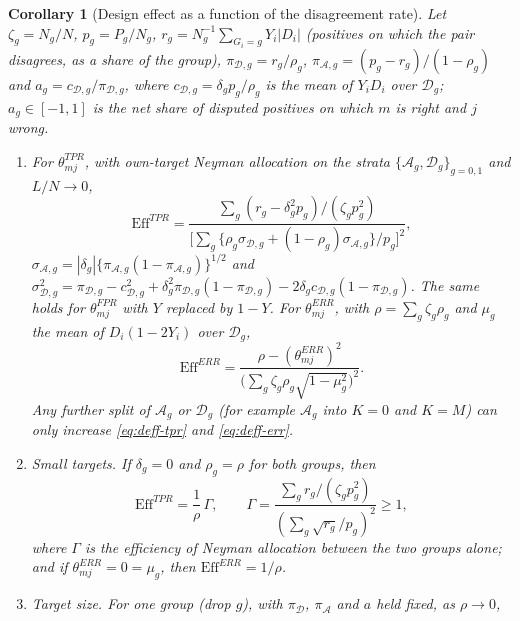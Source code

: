 \documentclass[pdflatex,sn-mathphys-num,iicol]{sn-jnl}
\theoremstyle{thmstyleone}
\newtheorem{corollary}[proposition]{Corollary}
\theoremstyle{thmstyletwo}
\theoremstyle{thmstylethree}
\begin{document}
\begin{corollary}[Design effect as a function of the disagreement rate]\label{prop:deff}
Let $\zeta_g=N_g/N$, $p_g=P_g/N_g$, $r_g=N_g^{-1}\sum_{G_i=g}Y_i|D_i|$ (positives on which the pair
disagrees, as a share of the group), $\pi_{\mathcal D,g}=r_g/\rho_g$,
$\pi_{\mathcal A,g}=(p_g-r_g)/(1-\rho_g)$ and $a_g=c_{\mathcal D,g}/\pi_{\mathcal D,g}$, where
$c_{\mathcal D,g}=\delta_gp_g/\rho_g$ is the mean of $Y_iD_i$ over $\mathcal D_g$; $a_g\in[-1,1]$
is the net share of disputed positives on which $m$ is right and $j$ wrong.
\begin{enumerate}
\item[(a)] For $\theta^{TPR}_{mj}$, with own-target Neyman allocation on the strata
$\{\mathcal A_g,\mathcal D_g\}_{g=0,1}$ and $L/N\to0$,
\begin{equation}\label{eq:deff-tpr}
\mathrm{Eff}^{TPR}=\frac{\sum_g(r_g-\delta_g^2p_g)/(\zeta_gp_g^2)}
{\big[\sum_g\{\rho_g\sigma_{\mathcal D,g}+(1-\rho_g)\sigma_{\mathcal A,g}\}/p_g\big]^2},
\end{equation}
$\sigma_{\mathcal A,g}=|\delta_g|\{\pi_{\mathcal A,g}(1-\pi_{\mathcal A,g})\}^{1/2}$ and $\sigma^2_{\mathcal D,g}=\pi_{\mathcal D,g}-c_{\mathcal D,g}^2+\delta_g^2\pi_{\mathcal D,g}(1-\pi_{\mathcal D,g})
-2\delta_gc_{\mathcal D,g}(1-\pi_{\mathcal D,g})$. The same holds for $\theta^{FPR}_{mj}$ with $Y$
replaced by $1-Y$. For $\theta^{ERR}_{mj}$, with $\rho=\sum_g\zeta_g\rho_g$ and $\mu_g$ the mean of
$D_i(1-2Y_i)$ over $\mathcal D_g$,
\begin{equation}\label{eq:deff-err}
\mathrm{Eff}^{ERR}=\frac{\rho-(\theta^{ERR}_{mj})^2}{\big(\sum_g\zeta_g\rho_g\sqrt{1-\mu_g^2}\big)^2}.
\end{equation}
Any further split of $\mathcal A_g$ or $\mathcal D_g$ (for example $\mathcal A_g$ into $K=0$ and
$K=M$) can only increase \eqref{eq:deff-tpr} and \eqref{eq:deff-err}.
\item[(b)] \emph{Small targets.} If $\delta_g=0$ and $\rho_g=\rho$ for both groups, then
\begin{equation}\label{eq:deff-small}
\mathrm{Eff}^{TPR}=\frac1\rho\,\Gamma,\qquad
\Gamma=\frac{\sum_gr_g/(\zeta_gp_g^2)}{(\sum_g\sqrt{r_g}/p_g)^2}\ge1,
\end{equation}
where $\Gamma$ is the efficiency of Neyman allocation between the two groups alone; and if
$\theta^{ERR}_{mj}=0=\mu_g$, then $\mathrm{Eff}^{ERR}=1/\rho$.
\item[(c)] \emph{Target size.} For one group (drop $g$), with $\pi_{\mathcal D}$,
$\pi_{\mathcal A}$ and $a$ held fixed, as $\rho\to0$,

\end{enumerate}
\end{corollary}
\end{document}
